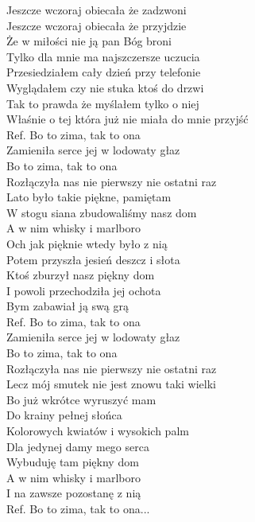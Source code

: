 
Jeszcze wczoraj obiecała że zadzwoni \\
Jeszcze wczoraj obiecała że przyjdzie  \\
Że w miłości nie ją pan Bóg broni  \\
Tylko dla mnie ma najszczersze uczucia  \\
Przesiedziałem cały dzień przy telefonie  \\
Wyglądałem czy nie stuka ktoś do drzwi  \\
Tak to prawda że myślałem tylko o niej  \\
Właśnie o tej która już nie miała do mnie przyjść  \\
\hops
Ref. Bo to zima, tak to ona\\
 Zamieniła serce jej w lodowaty głaz \\
 Bo to zima, tak to ona \\
 Rozłączyła nas nie pierwszy nie ostatni raz  \\
\hops
Lato było takie piękne, pamiętam  \\
W stogu siana zbudowaliśmy nasz dom  \\
A w nim whisky i marlboro \\
Och jak pięknie wtedy było z nią  \\
Potem przyszła jesień deszcz i słota  \\
Ktoś zburzył nasz piękny dom  \\
I powoli przechodziła jej ochota  \\
Bym zabawiał ją swą grą  \\
\hops
Ref. Bo to zima, tak to ona\\
 Zamieniła serce jej w lodowaty głaz \\
 Bo to zima, tak to ona \\
 Rozłączyła nas nie pierwszy nie ostatni raz  \\
\hops
Lecz mój smutek nie jest znowu taki wielki  \\
Bo już wkrótce wyruszyć mam  \\
Do krainy pełnej słońca  \\
Kolorowych kwiatów i wysokich palm  \\
Dla jedynej damy mego serca  \\
Wybuduję tam piękny dom  \\
A w nim whisky i marlboro  \\
I na zawsze pozostanę z nią  \\
\hops
Ref. Bo to zima, tak to ona...